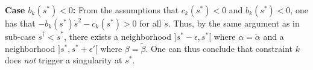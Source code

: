 \documentclass[9pt,technote]{IEEEtran}
\begin{document}

\textbf{Case $b_k(s^*)<0$:} From the assumptions that $c_k(s^*)<0$ and
$b_k(s^*)<0$, one has that $-b_k(s^*)\dot s^2-c_k(s^*)>0$ for all
$\dot s$. Thus, by the same argument as in sub-case
$\dot{s}^\dag{}<\dot s^*$, there exists a neighborhood
$]s^*-\epsilon,s^*[$ where $\alpha = \tilde{\alpha}$ and a
neighborhood $]s^*,s^*+\epsilon'[$ where $\beta = \tilde{\beta}$. One
can thus conclude that constraint $k$ does \emph{not} trigger a
singularity at $s^*$.

\end{document}
